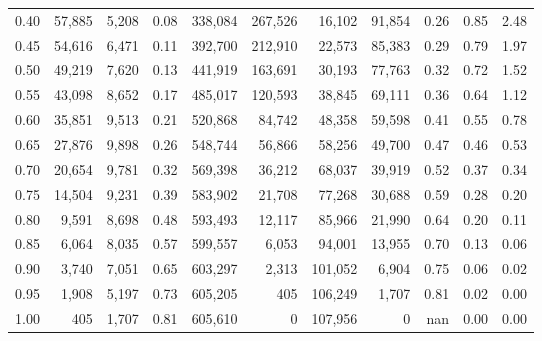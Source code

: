 \begin{table}[]
\begin{tabular}{
	*{3}{>{\normalfont\normalsize}r}
	*{1}{>{\normalfont\normalsize}c}
	*{7}{>{\normalfont\normalsize}r}
}
0.40 &  57,885 &  5,208 &                                       0.08 &  338,084 &  267,526 &   16,102 &   91,854 &  0.26 &  0.85 &                         2.48 \\
0.45 &  54,616 &  6,471 &                                       0.11 &  392,700 &  212,910 &   22,573 &   85,383 &  0.29 &  0.79 &                         1.97 \\
0.50 &  49,219 &  7,620 &                                       0.13 &  441,919 &  163,691 &   30,193 &   77,763 &  0.32 &  0.72 &                         1.52 \\
0.55 &  43,098 &  8,652 &                                       0.17 &  485,017 &  120,593 &   38,845 &   69,111 &  0.36 &  0.64 &                         1.12 \\
0.60 &  35,851 &  9,513 &                                       0.21 &  520,868 &   84,742 &   48,358 &   59,598 &  0.41 &  0.55 &                         0.78 \\
0.65 &  27,876 &  9,898 &                                       0.26 &  548,744 &   56,866 &   58,256 &   49,700 &  0.47 &  0.46 &                         0.53 \\
0.70 &  20,654 &  9,781 &                                       0.32 &  569,398 &   36,212 &   68,037 &   39,919 &  0.52 &  0.37 &                         0.34 \\
0.75 &  14,504 &  9,231 &                                       0.39 &  583,902 &   21,708 &   77,268 &   30,688 &  0.59 &  0.28 &                         0.20 \\
0.80 &   9,591 &  8,698 &                                       0.48 &  593,493 &   12,117 &   85,966 &   21,990 &  0.64 &  0.20 &                         0.11 \\
0.85 &   6,064 &  8,035 &                                       0.57 &  599,557 &    6,053 &   94,001 &   13,955 &  0.70 &  0.13 &                         0.06 \\
0.90 &   3,740 &  7,051 &                                       0.65 &  603,297 &    2,313 &  101,052 &    6,904 &  0.75 &  0.06 &                         0.02 \\
0.95 &   1,908 &  5,197 &                                       0.73 &  605,205 &      405 &  106,249 &    1,707 &  0.81 &  0.02 &                         0.00 \\
1.00 &     405 &  1,707 &                                       0.81 &  605,610 &        0 &  107,956 &        0 &   nan &  0.00 &                         0.00 \\
\bottomrule
\end{tabular}
\end{table}

